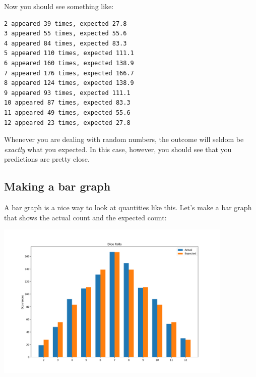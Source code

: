 Now you should see something like:
\begin{Verbatim}
2 appeared 39 times, expected 27.8
3 appeared 55 times, expected 55.6
4 appeared 84 times, expected 83.3
5 appeared 110 times, expected 111.1
6 appeared 160 times, expected 138.9
7 appeared 176 times, expected 166.7
8 appeared 124 times, expected 138.9
9 appeared 93 times, expected 111.1
10 appeared 87 times, expected 83.3
11 appeared 49 times, expected 55.6
12 appeared 23 times, expected 27.8
\end{Verbatim}

Whenever you are dealing with random numbers, the outcome will seldom
be \textit{exactly} what you expected. In this case, however, you should see that you
predictions are pretty close.

\subsection{Making a bar graph}



A bar graph is a nice way to look at quantities like this.  Let's make a bar graph that shows the actual count and the expected count:

\includegraphics[width= 0.85\textwidth]{dice1.png}

